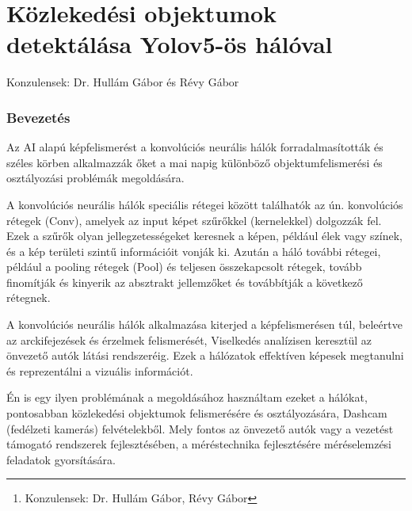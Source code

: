 \documentclass[12pt,oneside,a4paper]{article}
\title{\titletext}
\author{Nyilas Péter\thanks{Konzulensek: Dr. Hullám Gábor, Révy Gábor}}
\date{\today}
\theoremstyle{remark}
\begin{document}
\maketitle
\newpage
\tableofcontents\label{ossz:tartalomjegyzek}
\newpage




\thispagestyle{empty}

\vspace*{\fill}
\part{Közlekedési objektumok detektálása Yolov5-ös hálóval}\label{part:kozlekedesi-objektumok-detektalasa-yolov5-os-haloval}
Konzulensek:
Dr. Hullám Gábor és
Révy Gábor
\vspace*{\fill}

\section{Bevezetés}\label{sec:bevezetes2}

Az AI alapú képfelismerést a konvolúciós neurális hálók forradalmasították és széles körben alkalmazzák őket a mai
napig különböző objektumfelismerési és osztályozási problémák megoldására.

A konvolúciós neurális hálók speciális rétegei között találhatók az ún. konvolúciós rétegek (Conv), amelyek az input képet
szűrőkkel (kernelekkel) dolgozzák fel. Ezek a szűrők olyan jellegzetességeket keresnek a képen, például élek vagy színek,
és a kép területi szintű információit vonják ki. Azután a háló további rétegei, például a pooling rétegek (Pool) és
teljesen összekapcsolt rétegek, tovább finomítják és kinyerik az absztrakt jellemzőket és továbbítják a következő rétegnek.


A konvolúciós neurális hálók alkalmazása kiterjed a képfelismerésen túl, beleértve az arckifejezések és érzelmek
felismerését, Viselkedés analízisen keresztül az önvezető autók látási rendszeréig. Ezek a hálózatok effektíven képesek
megtanulni és reprezentálni a vizuális információt.


Én is egy ilyen problémának a megoldásához használtam ezeket a hálókat, pontosabban közlekedési objektumok felismerésére
és osztályozására, Dashcam (fedélzeti kamerás) felvételekből.
Mely fontos az önvezető autók vagy a vezetést támogató rendszerek fejlesztésében, a méréstechnika fejlesztésére
méréselemzési feladatok gyorsítására.
\end{document}
